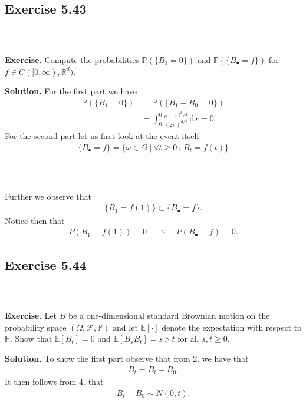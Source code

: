 \documentclass{beamer}
\numberwithin{equation}{section}
\newenvironment{frame2}{\begin{frame}\frametitle{{\normalsize \secname} \\ {\large \subsecname}}}{\end{frame}}
\begin{document}
\subsection{Exercise 5.43}

\begin{frame2}
    \textbf{Exercise.} Compute the probabilities $\mathbb{P}(\{B_1 = 0\})$ and $\mathbb{P}(\{B_\bullet = f\})$ for $f \in C([0,\infty),\mathbb{R}^d)$.

    \vspace{10pt}
    \textbf{Solution.} 
    For the first part we have
    \begin{align}
        \mathbb{P}(\{B_1 = 0\}) &= \mathbb{P}(\{B_1 - B_0 = 0\}) \\
        &= \int_0^0 \frac{e^{-\|x\|^2/2}}{(2\pi)^{d/2}}\,\text{d}x = 0.
    \end{align}
    For the second part let us first look at the event itself
    \begin{align}
        \{B_\bullet = f\} = \{\omega \in \Omega \ | \ \forall t\geq 0\,:\, B_t = f(t)\}
    \end{align}
\end{frame2}

\begin{frame2}
    Further we observe that
    \begin{align}
        \{B_1 = f(1)\} \subset \{B_\bullet = f\}.
    \end{align}
    Notice then that
    \begin{align}
        P(B_1 = f(1)) = 0 \quad \Rightarrow \quad P(B_\bullet = f) = 0.
    \end{align}
\end{frame2}

\subsection{Exercise 5.44}

\begin{frame2}
    \textbf{Exercise.} 
    Let $B$ be a one-dimensional standard Brownian motion on the probability space $(\Omega, \mathcal{F}, \mathbb{P})$ and let $\mathbb{E}[\cdot]$ denote the expectation with respect to $\mathbb{P}$.
    Show that $\mathbb{E}[B_t] = 0$ and $\mathbb{E}[B_s B_t] = s \wedge t$ for all $s,t \geq 0$.

    \vspace{10pt}
    \textbf{Solution.}
    To show the first part observe that from 2.\! we have that
    \begin{align}
        B_t = B_t - B_0.
    \end{align}
    It then follows from 4.\! that
    \begin{align}
        B_t - B_0 \sim N(0,t).
    \end{align}
\end{frame2}
\end{document}
